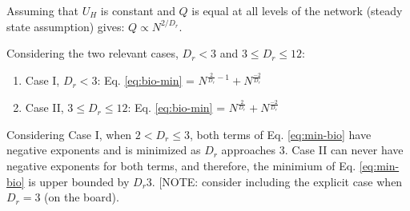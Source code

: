 \documentclass[12pt]{article}
\begin{document}
Assuming that $U_H$ is constant and $Q$ is equal at all levels of the
network (steady state assumption) gives:
$ Q \propto  N^{2/D_r}$.  





Considering the two relevant cases, $D_r < 3$ and $ 3 \leq D_r \leq 12$:
\begin{enumerate}
\item Case I,  $D_r < 3$: Eq. \ref{eq:bio-min} = $N^{\frac{2}{D_r}-1} +
  N^{\frac{-2}{D_r}}$
\item Case II, $ 3 \leq D_r \leq 12$: Eq. \ref{eq:bio-min} = $N^{\frac{2}{D_r}}
  + N^{\frac{-2}{D_r}}$
\end{enumerate}

Considering Case I, when $2 < D_r \leq 3$, both terms of
Eq. \ref{eq:min-bio} have negative exponents and is minimized as $D_r$
approaches 3.  Case II can never have negative exponents for both
terms, and therefore, the minimium of Eq. \ref{eq:min-bio} is upper
bounded by $D_r 3$.  [NOTE: consider including the explicit case when
$D_r = 3$ (on the board).
\end{document}
